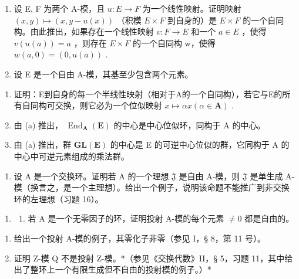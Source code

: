 \begin{enumerate}
\def\labelenumi{\arabic{enumi}.}
\setcounter{enumi}{24}
\item
  设 E, F 为两个 A-模，且 \(u: E \to F\) 为一个线性映射。证明映射 \((x, y) \mapsto (x, y - u(x))\) （积模 \(E \times F\) 到自身的）是 \(E \times F\) 的一个自同构。由此推出，如果存在一个线性映射 \(v: F \to E\) 和一个 \(a \in E\) ，使得 \(v(u(a)) = a\) ，则存在 \(E \times F\) 的一个自同构 w，使得 \(w(a, 0) = (0, u(a))\) .
\item
  设 E 是一个自由 A-模，其基至少包含两个元素。
\end{enumerate}

\begin{enumerate}
\def\labelenumi{(\alph{enumi})}
\item
  证明：E到自身的每一个半线性映射（相对于A的一个自同构），若它与E的所有自同构可交换，则它必为一个位似映射 \(x \mapsto \alpha x (\alpha \in \mathbf{A})\) .
\item
  由 (a) 推出， \(\operatorname{End}_{\mathbf{A}}(\mathbf{E})\) 的中心是中心位似环，同构于 A 的中心。
\item
  由 (a) 推出，群 \(\mathbf{GL}(\mathbf{E})\) 的中心是 E 的可逆中心位似的群，它同构于 A 的中心中可逆元素组成的乘法群。
\end{enumerate}

\begin{enumerate}
\def\labelenumi{\arabic{enumi}.}
\setcounter{enumi}{26}
\tightlist
\item
  设 A 是一个交换环。证明若 A 的一个理想 \(\mathfrak{J}\) 是自由 A-模，则 \(\mathfrak{J}\) 是单生成 A-模（换言之，是一个主理想）。给出一个例子，说明该命题不能推广到非交换环的左理想（习题 16）。
\end{enumerate}

\BourbakiExercisesSection

\begin{enumerate}
\def\labelenumi{\arabic{enumi}.}
\tightlist
\item
  \begin{enumerate}
  \def\labelenumii{(\alph{enumii})}
  \tightlist
  \item
    若 A 是一个无零因子的环，证明投射 A-模的每个元素 \(\neq0\) 都是自由的。
  \end{enumerate}
\end{enumerate}

\begin{enumerate}
\def\labelenumi{(\alph{enumi})}
\setcounter{enumi}{1}
\item
  给出一个投射 A-模的例子，其零化子非零（参见 I，§ 8，第 11 号）。
\item
  证明 Z-模 Q 不是投射 Z-模。*（参见《交换代数》II，§ 5，习题 11，其中给出了整环上一个有限生成但不自由的投射模的例子。）*
\end{enumerate}

